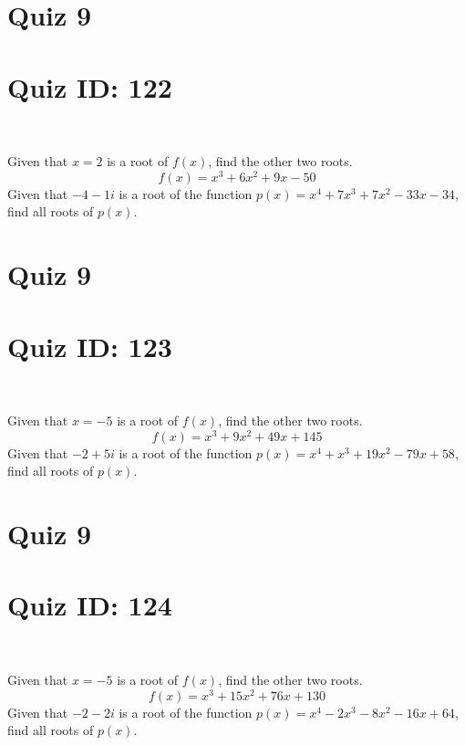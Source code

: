 \documentclass{exam}
\begin{document}
\section*{Quiz 9}
\section*{Quiz ID: 122}
\vspace{0.5cm}\
\vspace{1cm}\
\begin{questions}
\question Given that $x=2$ is a root of $f(x)$, find the other two roots.\[f(x)=
x^3 + 6x^2 + 9x - 50\]
\newpage
\question Given that $-4-1\mathit{i}$ is a root of the function $p(x)=
x^4 + 7x^3 + 7x^2 - 33x - 34$, find all roots of $p(x)$. 
\end{questions}\newpage
\newpage
\section*{Quiz 9}
\section*{Quiz ID: 123}
\vspace{0.5cm}\
\vspace{1cm}\
\begin{questions}
\question Given that $x=-5$ is a root of $f(x)$, find the other two roots.\[f(x)=
x^3 + 9x^2 + 49x + 145\]
\newpage
\question Given that $-2+5\mathit{i}$ is a root of the function $p(x)=
x^4 + x^3 + 19x^2 - 79x + 58$, find all roots of $p(x)$. \makeemptybox{\stretch{1}}
\end{questions}\newpage
\newpage
\section*{Quiz 9}
\section*{Quiz ID: 124}
\vspace{0.5cm}\
\vspace{1cm}\
\begin{questions}
\question Given that $x=-5$ is a root of $f(x)$, find the other two roots.\[f(x)=
x^3 + 15x^2 + 76x + 130\]
\newpage
\question Given that $-2-2\mathit{i}$ is a root of the function $p(x)=
x^4 - 2x^3 - 8x^2 - 16x + 64$, find all roots of $p(x)$. \makeemptybox{\stretch{1}}
\end{questions}\newpage
\newpage
\end{document}

